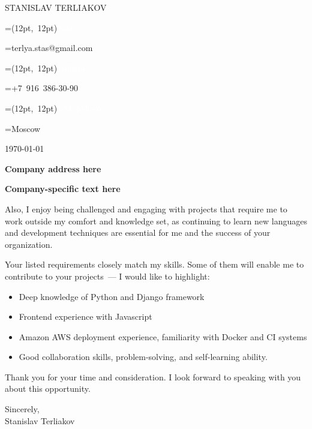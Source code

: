 \documentclass[9pt]{article}
\newcommand{\vcenteredhbox}[1]{
	\begingroup%
		\setbox0=\hbox{#1}\parbox{\wd0}{\box0}%
	\endgroup%
}
\newcommand{\icon}[3]{
	\vcenteredhbox{\makebox(#2, #2){\textcolor{white}{\large\csname fa#1\endcsname}}}
	\hspace{0.2cm}
	\vcenteredhbox{#3}
}
\begin{document}
	\begin{tcolorbox}[size=tight,
			sharp corners,
			enhanced,
			colback=leftBackground,
			colframe=leftBackground,
			coltext=white,
			left=2cm,
			right=2cm,
			bottom=1cm,
			top=1cm]
		\linespread{1.5}
		\setlength{\parskip}{12px}

		\center

		{\LARGE STANISLAV TERLIAKOV}

		\icon{At}{12pt}{terlya.stas@gmail.com}
		\hfill
		\icon{Phone}{12pt}{+7 916 386-30-90}
		\hfill
		\icon{MapMarker}{12pt}{Moscow}
	\end{tcolorbox}

	\vspace{1cm}

	\hspace{1.5cm}
	\begin{minipage}{\linewidth - 4cm}
		\setlength{\parindent}{2em}
		\setlength{\parskip}{6px}
		\noindent
		\today

		\noindent
                \textbf{\Large Company address here}

		\vspace{1cm}

                \textbf{\Large Company-specific text here}

		Also, I enjoy being challenged and engaging with projects that require me to work outside my comfort and knowledge set, 
                as continuing to learn new languages and development techniques are essential for me and the success of your organization.

		Your listed requirements closely match my skills. Some of them will enable me to contribute to your
                projects~--- I would like to highlight:

		\vspace{-9px}
		\begin{itemize}
			\setlength{\itemsep}{0px}
			\item Deep knowledge of Python and Django framework
			\item Frontend experience with Javascript
			\item Amazon AWS deployment experience, familiarity with Docker and CI systems
			\item Good collaboration skills, problem-solving, and self-learning ability.
		\end{itemize}

		Thank you for your time and consideration. I look forward to speaking with you about this opportunity.

		Sincerely,\\
		\indent Stanislav Terliakov
	\end{minipage}
\end{document}
